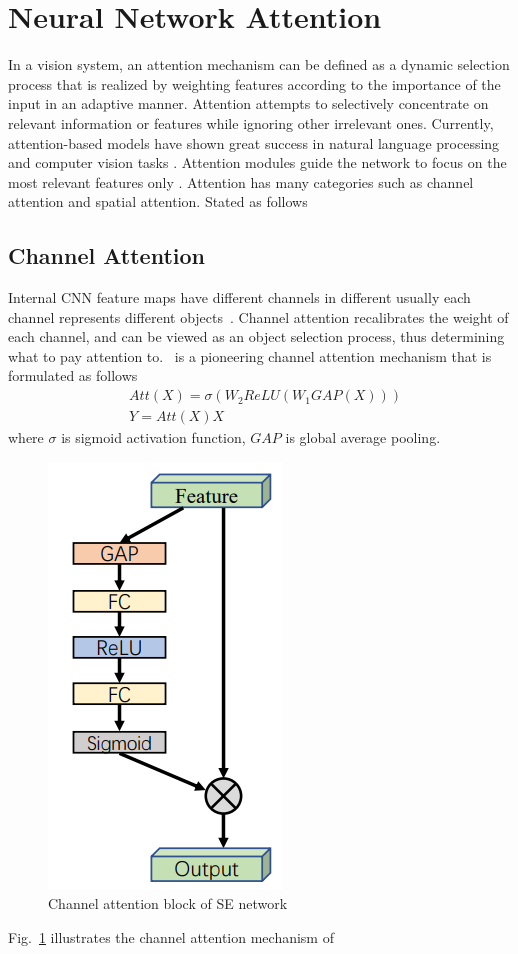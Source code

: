 \section{Neural Network Attention}
In a vision system, an attention mechanism can be defined as a dynamic selection process that is realized by weighting features according to the importance of the input in an adaptive manner. Attention attempts to selectively concentrate on relevant information or features while ignoring other irrelevant ones.  Currently, attention-based models have shown great success in natural language processing \cite{vaswani2017attention} and computer vision tasks \cite{guo2022attention}. Attention modules guide the network to focus on the most relevant features only \cite{guo2022attention}. Attention has many categories such as channel attention and spatial attention. Stated as follows 
\subsection{Channel Attention}
Internal CNN feature maps have different channels in different usually each channel represents different objects~\cite{chen2017sca}. Channel attention recalibrates the weight of each channel, and can be viewed as an object selection process, thus determining what to pay attention to.~\cite{hu2018squeeze} is a pioneering channel attention mechanism that is formulated as follows
 \begin{equation}
    \begin{split}
        &Att(X) = \sigma(W_2ReLU(W_1GAP(X)))\\
        &Y = Att(X)X 
    \end{split}
\end{equation}
\noindent where $\sigma$ is sigmoid activation function, $GAP$ is global average pooling.
\begin{figure}
    \begin{center}
        \includegraphics[width=.3\textwidth]{Figures/SE_attentBlock.png}
        \caption{\label{fig:SE_block} Channel attention block of SE network}
    \end{center}
\end{figure}
Fig.~\ref{fig:SE_block} illustrates the channel attention mechanism of~\cite{hu2018squeeze}
